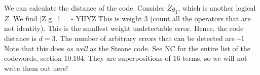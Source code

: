 We can calculate the distance of the code. Consider $\bar{Z}g_1$, which is another logical $Z$. We find
\beq
\bar{Z} g_1 = - YIIYZ
\eeq
This is weight 3 (count all the operators that are not identity). This is the smallest weight undetectable error. Hence, the code distance is $d = 3$. The number of arbitrary errors that can be detected are
\beq
{} \sim 1
\eeq
Note that this does \emph{as well} as the Steane code. See NC for the entire list of the codewords, section 10.104. They are superpositions of 16 terms, so we will not write them out here! 

 


